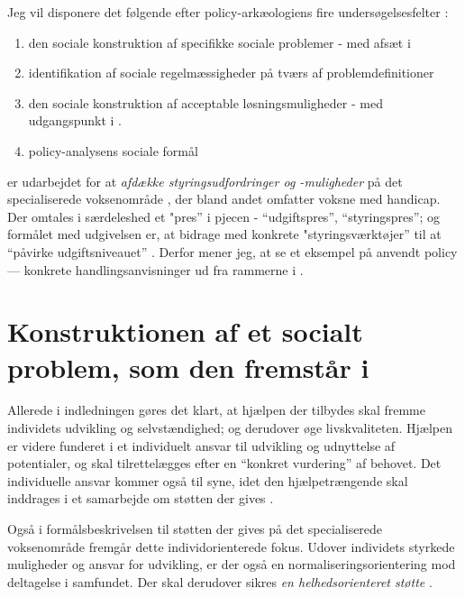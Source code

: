 Jeg vil disponere det følgende efter policy-arkæologiens fire undersøgelsesfelter \autocite[s. 300]{scheurichPolicyArchaeologyNew1994}:
\begin{enumerate}
  \item
    den sociale konstruktion af specifikke sociale problemer - med afsæt i 
  \item
    identifikation af sociale regelmæssigheder på tværs af problemdefinitioner
  \item
    den sociale konstruktion af acceptable løsningsmuligheder - med udgangspunkt i .
  \item
    policy-analysens sociale formål
\end{enumerate}

 er udarbejdet for at \textit{afdække styringsudfordringer og -muligheder} på det specialiserede voksenområde \autocite[s. 2]{klStyringAfDet2017}, der bland andet omfatter voksne med handicap.
Der omtales i særdeleshed et "pres” i pjecen - “udgiftspres”, “styringspres”; og formålet med udgivelsen er, at bidrage med konkrete "styringsværktøjer” til at “påvirke udgiftsniveauet” \autocite[s. 2, 3. m.fl.]{klStyringAfDet2017}.
Derfor mener jeg, at se et eksempel på anvendt policy — konkrete handlingsanvisninger ud fra rammerne i .

\section{Konstruktionen af et socialt problem, som den fremstår i }

Allerede i indledningen gøres det klart, at hjælpen der tilbydes skal fremme individets udvikling og selvstændighed; og derudover øge livskvaliteten.
Hjælpen er videre funderet i et individuelt ansvar til udvikling og udnyttelse af potentialer, og skal tilrettelægges efter en “konkret vurdering” af behovet.
Det individuelle ansvar kommer også til syne, idet den hjælpetrængende skal inddrages i et samarbejde om støtten der gives \autocite[§§ 2-3]{social-ogindenrigsministerietBekendtgorelseAfLov2019}.

Også i formålsbeskrivelsen til støtten der gives på det specialiserede voksenområde fremgår  dette individorienterede fokus.
Udover individets styrkede muligheder og ansvar for udvikling, er der også en normaliseringsorientering mod deltagelse i samfundet.
Der skal derudover sikres \textit{en helhedsorienteret støtte} \autocite[§ 81]{social-ogindenrigsministerietBekendtgorelseAfLov2019}.


